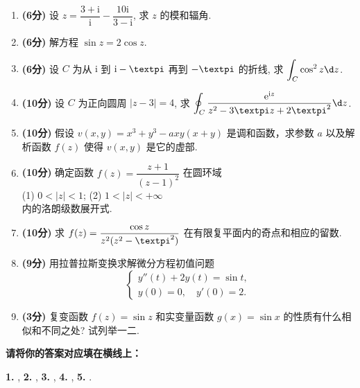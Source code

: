 \documentclass[simple]{hfutexam}
\newcommand{\ii}{\mathrm{i}}
\newcommand{\jj}{\mathrm{j}}
\newcommand{\ee}{\mathrm{e}}
\newcommand{\cpi}{{\text{\textpi}}}
\newcommand{\dirac}{{\text{\textdelta}}}
\newcommand{\dint}{\displaystyle\int}
\newcommand{\doint}{\displaystyle\oint}
\begin{document}
\begin{enumerate}
  \item \textbf{(6分)} 设 $z=\dfrac{3+\ii}{\ii}-\dfrac{10\ii}{3-\ii}$, 求 $z$ 的模和辐角.
  \item \textbf{(6分)} 解方程 $\sin z=2\cos z$.
  \item \textbf{(6分)} 设 $C$ 为从 $\ii$ 到 $\ii-\cpi$ 再到 $-\cpi$ 的折线, 求 $\dint_C\cos^2z\d z$.
  \item \textbf{(10分)} 设 $C$ 为正向圆周 $|z-3|=4$, 求 $\doint_C\frac{\ee^{\ii z}}{z^2-3\cpi z+2\cpi^2}\d z$.
  \item \textbf{(10分)} 假设 $v(x,y)=x^3+y^3-axy(x+y)$ 是调和函数，求参数 $a$ 以及解析函数 $f(z)$ 使得 $v(x,y)$ 是它的虚部.
  \item \textbf{(10分)} 确定函数 $f(z)=\dfrac{z+1}{(z-1)^2}$ 在圆环域\\
  \indent (1) $0<|z|<1$; \hspace{2em} (2) $1<|z|<+\infty$\\
  内的洛朗级数展开式.
  \item \textbf{(10分)} 求 $f(z)=\dfrac{\cos z}{z^2(z^2-\cpi^2)}$ 在有限复平面内的奇点和相应的留数.
  \item \textbf{(9分)} 用拉普拉斯变换求解微分方程初值问题
  \[\begin{cases}
    y''(t)+2y(t)=\sin t,\\
    y(0)=0,\quad y'(0)=2.
  \end{cases}\]
  \item \textbf{(3分)} 复变函数 $f(z)=\sin z$ 和实变量函数 $g(x)=\sin x$ 的性质有什么相似和不同之处? 试列举一二.
\end{enumerate}


\newpage
{}
\ZhuanYeBanJi{}
\maketitle


\textbf{请将你的答案对应填在横线上：}

\textbf{1.} \fillblank[2.5cm]{$\ee^{\cpi/2}$}, 
\textbf{2.} , 
\textbf{3.} , 
\textbf{4.} , 
\textbf{5.} \fillblank[2.5cm]{$2\cpi\jj\dirac(\omega+1)$}.
\end{document}
